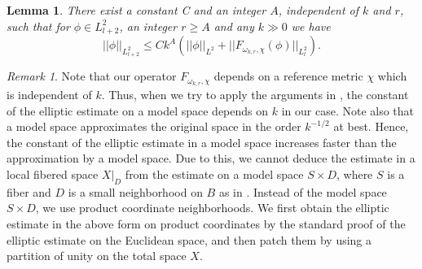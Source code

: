 \documentclass{amsart}
\numberwithin{equation}{section}
\theoremstyle{plain}
\newtheorem{lemma}[equation]{Lemma}
\theoremstyle{definition}
\theoremstyle{remark}
\newtheorem{remark}[equation]{Remark}
\begin{document}
\begin{lemma}\label{elliptic}
There exist a constant C and an integer $A$, independent of $k$ and $r$, 
such that for $\phi \in L^2_{l+2}$, an integer $r \ge A$ and any $k \gg 0$
we have
$$ ||\phi||_{L^2_{l+2}} \le C k^A\left( ||\phi||_{L^2} + ||F_{\omega_{k,r}, \chi}(\phi)||_{L^2_l} \right).$$
\end{lemma}
\begin{remark}
Note that our operator $F_{\omega_{k,r},\chi}$ depends on a reference metric $\chi$ which is independent of $k$. Thus, when we try to apply the arguments in \cite[Sections 5 and 6]{Fine}, the constant of the elliptic estimate on a model space depends on $k$ in our case. Note also that a model space approximates the original space in the order $k^{-1/2}$ at best. Hence, the constant of the elliptic estimate in a model space increases faster than the approximation by a model space.
Due to this, we cannot deduce the estimate in a local fibered space $X|_D$ from the estimate on a model space $S \times D$, where $S$ is a fiber and $D$ is a small neighborhood on $B$ as in \cite[Lemma 5.9]{Fine}. 
Instead of the model space $S\times D$, 
we use product coordinate neighborhoods. We first obtain the elliptic estimate in the above form on product coordinates by the standard proof of the elliptic estimate on the Euclidean space, and then patch them by using a partition of unity on the total space $X$.
\end{remark}
\end{document}
